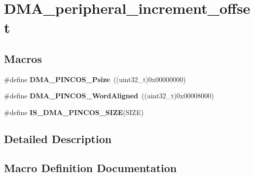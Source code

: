 \hypertarget{group___d_m_a__peripheral__increment__offset}{}\section{D\+M\+A\+\_\+peripheral\+\_\+increment\+\_\+offset}
\label{group___d_m_a__peripheral__increment__offset}
\subsection*{Macros}
\begin{DoxyCompactItemize}
\item 
\hypertarget{group___d_m_a__peripheral__increment__offset_ga939053c42e486b82963b8eecc809bce0}{}\#define {\bfseries D\+M\+A\+\_\+\+P\+I\+N\+C\+O\+S\+\_\+\+Psize}~((uint32\+\_\+t)0x00000000)\label{group___d_m_a__peripheral__increment__offset_ga939053c42e486b82963b8eecc809bce0}

\item 
\hypertarget{group___d_m_a__peripheral__increment__offset_gaae8184971db13b62cd9f4dc5aecf9c22}{}\#define {\bfseries D\+M\+A\+\_\+\+P\+I\+N\+C\+O\+S\+\_\+\+Word\+Aligned}~((uint32\+\_\+t)0x00008000)\label{group___d_m_a__peripheral__increment__offset_gaae8184971db13b62cd9f4dc5aecf9c22}

\item 
\#define {\bfseries I\+S\+\_\+\+D\+M\+A\+\_\+\+P\+I\+N\+C\+O\+S\+\_\+\+S\+I\+Z\+E}(S\+I\+Z\+E)
\end{DoxyCompactItemize}


\subsection{Detailed Description}


\subsection{Macro Definition Documentation}
\hypertarget{group___d_m_a__peripheral__increment__offset_ga2fcfea7f5dedb658358f1220773fb2f2}{}
